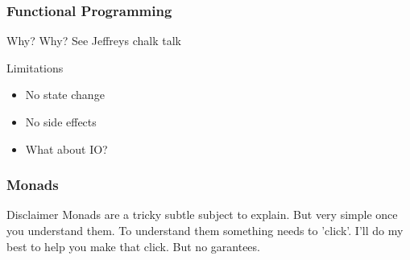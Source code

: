\begin{frame}
    \frametitle{Functional Programming}
    \begin{block}{Why?}
        Why? See Jeffreys chalk talk
    \end{block}
    \begin{block}{Limitations}
        \begin{itemize}
            \item No state change
            \item No side effects
            \item What about IO?
        \end{itemize}
    \end{block}
\end{frame}
\begin{frame}
    \frametitle{Monads}
    \begin{block}{Disclaimer}
        Monads are a tricky subtle subject to explain. But very simple once you understand them. To
        understand them something needs to 'click'. I'll do my best to help you make that click. But no garantees.
    \end{block}
\end{frame}
